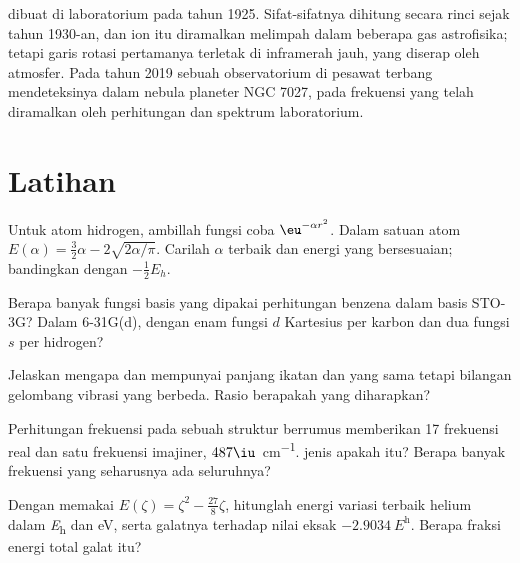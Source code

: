 \begin{history}
 dibuat di laboratorium pada tahun 1925. Sifat-sifatnya dihitung
secara rinci sejak tahun 1930-an, dan ion itu diramalkan melimpah dalam
beberapa gas astrofisika; tetapi garis rotasi pertamanya terletak di
inframerah jauh, yang diserap oleh atmosfer. Pada tahun 2019 sebuah
observatorium di pesawat terbang mendeteksinya dalam nebula planeter
NGC 7027, pada frekuensi yang telah diramalkan oleh perhitungan dan spektrum
laboratorium.
\end{history}

\section{Latihan}

\begin{exercise}[$\star$]\label{exo:b3:computational-chemistry:1}
Untuk atom hidrogen, ambillah fungsi coba $\eu^{-\alpha r^2}$. Dalam satuan atom
$E(\alpha) = \frac32\alpha - 2\sqrt{2\alpha/\pi}$. Carilah $\alpha$ terbaik dan
energi yang bersesuaian; bandingkan dengan $-\frac12E_h$.
\end{exercise}

\begin{exercise}[$\star$]\label{exo:b3:computational-chemistry:2}
Berapa banyak fungsi basis yang dipakai perhitungan benzena dalam basis
STO-3G? Dalam 6-31G(d), dengan enam fungsi $d$ Kartesius per karbon dan dua
fungsi $s$ per hidrogen?
\end{exercise}

\begin{exercise}[$\star$]\label{exo:b3:computational-chemistry:3}
Jelaskan mengapa  dan  mempunyai panjang ikatan dan 
yang sama tetapi bilangan gelombang vibrasi yang berbeda. Rasio berapakah
yang diharapkan?
\end{exercise}

\begin{exercise}[$\star$]\label{exo:b3:computational-chemistry:4}
Perhitungan frekuensi pada sebuah struktur berrumus  memberikan 17
frekuensi real dan satu frekuensi imajiner, $487\iu$~\unit{cm^{-1}}.  jenis apakah itu? Berapa banyak frekuensi yang seharusnya ada
seluruhnya?
\end{exercise}

\begin{exercise}[$\star\star$]\label{exo:b3:computational-chemistry:5}
Dengan memakai $E(\zeta) = \zeta^2 - \frac{27}{8}\zeta$, hitunglah energi
variasi terbaik helium dalam \unit{\hartree} dan eV, serta galatnya terhadap
nilai eksak $\qty{-2.9034}{\hartree}$. Berapa fraksi energi total galat itu?
\end{exercise}

